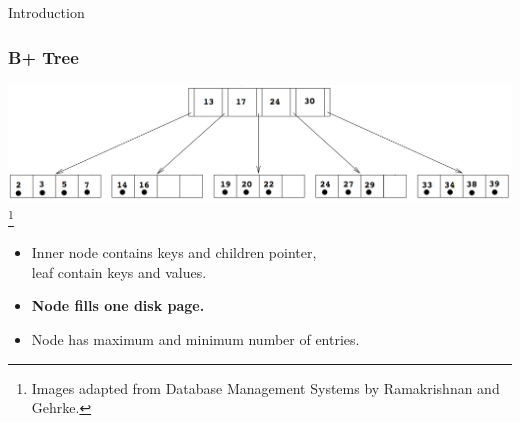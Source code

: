 \documentclass{beamer}
\newcommand\blfootnote[1]{%
  \begingroup
  \renewcommand\thefootnote{}\footnote{#1}%
  \addtocounter{footnote}{-1}%
  \endgroup
}
\begin{document}
\begin{section}{Introduction}
    \begin{frame}
      \frametitle{B+ Tree}
      \pause
      \vspace{-1em}
      \includegraphics[scale=0.2]{B+Tree.png}
      \blfootnote{\tiny Images adapted from Database Management Systems by Ramakrishnan and Gehrke.}
      \vspace{2em}
      \begin{itemize}
        \item Inner node contains keys and children pointer, \\leaf contain keys and values.
        \pause
        \item \textbf{Node fills one disk page.}
        \pause
        \item Node has maximum and minimum number of entries.
      \end{itemize}
    \end{frame}


\end{section}
\end{document}
